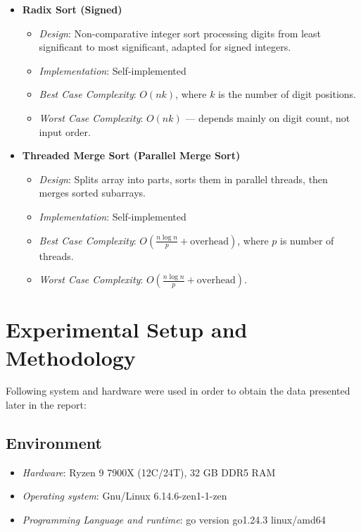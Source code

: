 \documentclass[11pt,a4paper]{article}
\begin{document}
\begin{itemize}
	\item \textbf{Radix Sort (Signed)}
	      \begin{itemize}
		      \item \textit{Design}: Non-comparative integer sort processing digits from least significant to most significant, adapted for signed integers.
		      \item \textit{Implementation}: Self-implemented
		      \item \textit{Best Case Complexity}: \(O(nk)\), where \(k\) is the number of digit positions.
		      \item \textit{Worst Case Complexity}: \(O(nk)\) — depends mainly on digit count, not input order.
	      \end{itemize}

	\item \textbf{Threaded Merge Sort (Parallel Merge Sort)}
	      \begin{itemize}
		      \item \textit{Design}: Splits array into parts, sorts them in parallel threads, then merges sorted subarrays.
		      \item \textit{Implementation}: Self-implemented
		      \item \textit{Best Case Complexity}: \(O\left(\frac{n \log n}{p} + \text{overhead}\right)\), where \(p\) is number of threads.
		      \item \textit{Worst Case Complexity}: \(O\left(\frac{n \log n}{p} + \text{overhead}\right)\).
	      \end{itemize}


\end{itemize}

\section{Experimental Setup and Methodology}
Following system and hardware were used in order to obtain the data presented later in the report:
\subsection{Environment}
\begin{itemize}
	\item \textit{Hardware}: Ryzen 9 7900X (12C/24T), 32 GB DDR5 RAM
	\item \textit{Operating system}: Gnu/Linux 6.14.6-zen1-1-zen
	\item \textit{Programming Language and runtime}: go version go1.24.3 linux/amd64
\end{itemize}
\end{document}
